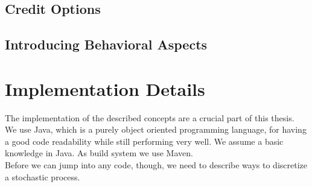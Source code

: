 \documentclass[12pt]{article}
\begin{document}
	\subsection{Credit Options}
	
	
	
	\subsection{Introducing Behavioral Aspects}
	
	
	
	
	
	\pagebreak
	\section{Implementation Details}
	The implementation of the described concepts are a crucial part of this thesis.\\
	We use Java, which is a purely object oriented programming language, for having a good  code readability while still performing very well. We assume a basic knowledge in Java.
	As build system we use Maven.\\
	Before we can jump into any code, though, we need to describe ways to discretize a stochastic process.
	
\end{document}
